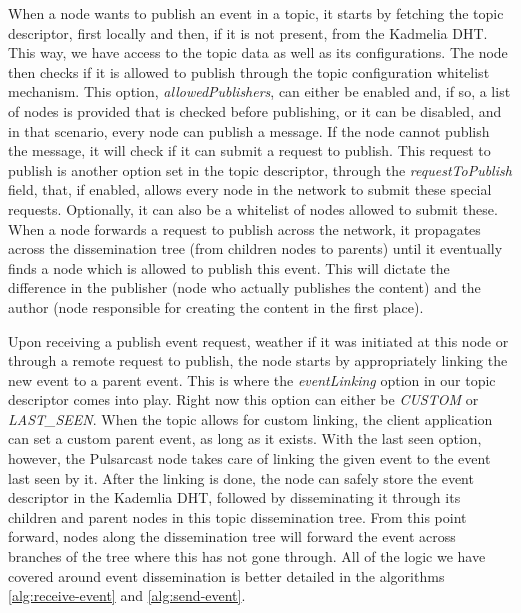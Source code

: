 When a node wants to publish an event in a topic, it starts by fetching the
topic descriptor, first locally and then, if it is not present, from the
Kadmelia DHT.  This way, we have access to the topic data as well as its
configurations. The node then checks if it is allowed to publish through the
topic configuration whitelist mechanism. This option, \emph{allowedPublishers},
can either be enabled and, if so, a list of nodes is provided that is checked
before publishing, or it can be disabled, and in that scenario, every node can
publish a message. If the node cannot publish the message, it will check if it
can submit a request to publish. This request to publish is another option set
in the topic descriptor, through the \emph{requestToPublish} field, that, if
enabled, allows every node in the network to submit these special requests.
Optionally, it can also be a whitelist of nodes allowed to submit these. When a
node forwards a request to publish across the network, it propagates across the
dissemination tree (from children nodes to parents) until it eventually finds a
node which is allowed to publish this event. This will dictate the difference
in the publisher (node who actually publishes the content) and the author (node
responsible for creating the content in the first place).

Upon receiving a publish event request, weather if it was initiated at this
node or through a remote request to publish, the node starts by appropriately
linking the new event to a parent event. This is where the \emph{eventLinking}
option in our topic descriptor comes into play. Right now this option can
either be \emph{CUSTOM} or \emph{LAST\_SEEN}. When the topic allows for custom
linking, the client application can set a custom parent event, as long as it
exists. With the last seen option, however, the Pulsarcast node takes care of
linking the given event to the event last seen by it. After the linking is
done, the node can safely store the event descriptor in the Kademlia DHT,
followed by disseminating it through its children and parent nodes in this
topic dissemination tree. From this point forward, nodes along the
dissemination tree will forward the event across branches of the tree where
this has not gone through. All of the logic we have covered around event
dissemination is better detailed in the algorithms \ref{alg:receive-event} and
\ref{alg:send-event}.

